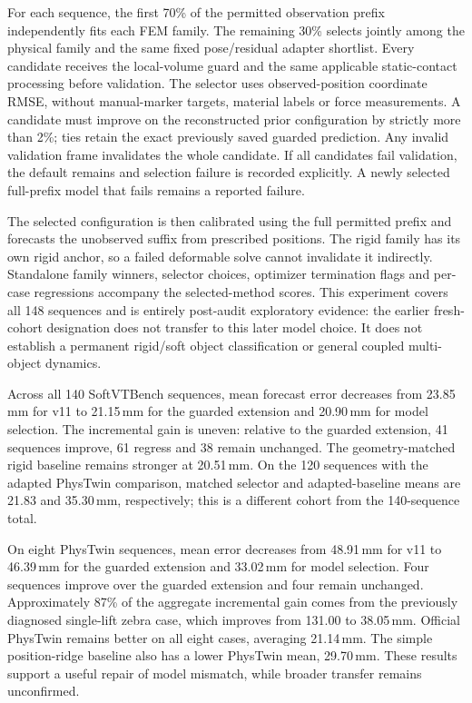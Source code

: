 \documentclass[10pt]{article}
\begin{document}
For each sequence, the first 70\% of the permitted observation prefix independently fits each FEM family. The remaining 30\% selects jointly among the physical family and the same fixed pose/residual adapter shortlist. Every candidate receives the local-volume guard and the same applicable static-contact processing before validation. The selector uses observed-position coordinate RMSE, without manual-marker targets, material labels or force measurements. A candidate must improve on the reconstructed prior configuration by strictly more than 2\%; ties retain the exact previously saved guarded prediction. Any invalid validation frame invalidates the whole candidate. If all candidates fail validation, the default remains and selection failure is recorded explicitly. A newly selected full-prefix model that fails remains a reported failure.

The selected configuration is then calibrated using the full permitted prefix and forecasts the unobserved suffix from prescribed positions. The rigid family has its own rigid anchor, so a failed deformable solve cannot invalidate it indirectly. Standalone family winners, selector choices, optimizer termination flags and per-case regressions accompany the selected-method scores. This experiment covers all 148 sequences and is entirely post-audit exploratory evidence: the earlier fresh-cohort designation does not transfer to this later model choice. It does not establish a permanent rigid/soft object classification or general coupled multi-object dynamics.
\par\FloatBarrier
Across all 140 SoftVTBench sequences, mean forecast error decreases from 23.85\,mm for v11 to 21.15\,mm for the guarded extension and 20.90\,mm for model selection. The incremental gain is uneven: relative to the guarded extension, 41 sequences improve, 61 regress and 38 remain unchanged. The geometry-matched rigid baseline remains stronger at 20.51\,mm. On the 120 sequences with the adapted PhysTwin comparison, matched selector and adapted-baseline means are 21.83 and 35.30\,mm, respectively; this is a different cohort from the 140-sequence total.

On eight PhysTwin sequences, mean error decreases from 48.91\,mm for v11 to 46.39\,mm for the guarded extension and 33.02\,mm for model selection. Four sequences improve over the guarded extension and four remain unchanged. Approximately 87\% of the aggregate incremental gain comes from the previously diagnosed single-lift zebra case, which improves from 131.00 to 38.05\,mm. Official PhysTwin remains better on all eight cases, averaging 21.14\,mm. The simple position-ridge baseline also has a lower PhysTwin mean, 29.70\,mm. These results support a useful repair of model mismatch, while broader transfer remains unconfirmed.
\end{document}
